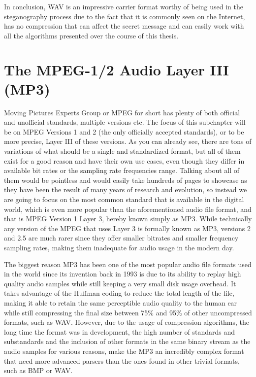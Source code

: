 In conclusion, WAV is an impressive carrier format worthy of being used in the steganography process due to the fact that it is commonly seen on the Internet, has no compression that can affect the secret message and can easily work with all the algorithms presented over the course of this thesis.

\section{The MPEG-1/2 Audio Layer III (MP3)}
Moving Pictures Experts Group or MPEG for short has plenty of both official and unofficial standards, multiple versions etc. The focus of this subchapter will be on MPEG Versions 1 and 2 (the only officially accepted standards), or to be more precise, Layer III of these versions. As you can already see, there are tons of variations of what should  be a single and standardized format, but all of them exist for a good reason and have their own use cases, even though they differ in available bit rates or the sampling rate frequencies range. Talking about all of them would be pointless and would easily take hundreds of pages to showcase as they have been the result of many years of research and evolution, so instead we are going to focus on the most common standard that is available in the digital world, which is even more popular than the aforementioned audio file format, and that is MPEG Version 1 Layer 3, hereby known simply as MP3. While technically any version of the MPEG that uses Layer 3 is formally known as MP3, versions 2 and 2.5 are much rarer since they offer smaller bitrates and smaller frequency sampling rates, making them inadequate for audio usage in the modern day.

The biggest reason MP3 has been one of the most popular audio file formats used in the world since its invention back in 1993 is due to its ability to replay high quality audio samples while still keeping a very small disk usage overhead. It takes advantage of the Huffman coding to reduce the total length of the file, making it able to retain the same perceptible audio quality to the human ear while still compressing the final size between 75\% and 95\% of other uncompressed formats, such as WAV\cite{genesis_of_mp3}. However, due to the usage of compression algorithms, the long time the format was in development, the high number of standards and substandards and the inclusion of other formats in the same binary stream as the audio samples for various reasons, make the MP3 an incredibly complex format that need more advanced parsers than the ones found in other trivial formats, such as BMP or WAV.

